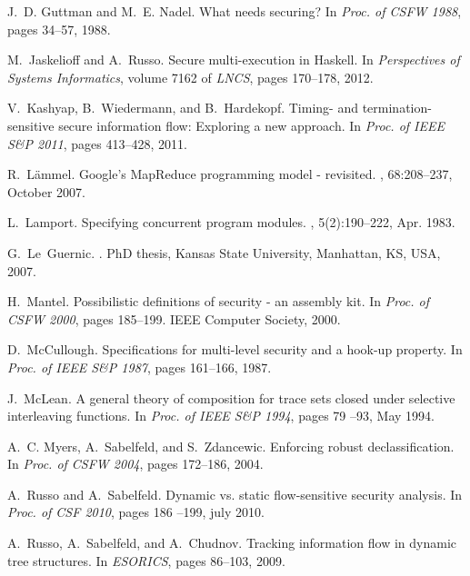 \documentclass[10pt,a4paper,oneside]{article}
\begin{document}
\begin{thebibliography}{10}
J.~D. Guttman and M.~E. Nadel.
\newblock What needs securing?
\newblock In {\em Proc. of CSFW 1988}, pages 34--57, 1988.

M.~Jaskelioff and A.~Russo.
\newblock Secure multi-execution in {H}askell.
\newblock In {\em Perspectives of Systems Informatics}, volume 7162 of {\em
  LNCS}, pages 170--178, 2012.

V.~Kashyap, B.~Wiedermann, and B.~Hardekopf.
\newblock Timing- and termination-sensitive secure information flow: Exploring
  a new approach.
\newblock In {\em Proc. of IEEE S\&P 2011}, pages 413--428, 2011.

R.~L\"{a}mmel.
\newblock Google's {MapReduce} programming model - revisited.
, 68:208--237, October 2007.

L.~Lamport.
\newblock Specifying concurrent program modules.
,
  5(2):190--222, Apr. 1983.

G.~Le~Guernic.
.
\newblock PhD thesis, Kansas State University, Manhattan, KS, USA, 2007.

H.~Mantel.
\newblock Possibilistic definitions of security - an assembly kit.
\newblock In {\em Proc. of CSFW 2000}, pages 185--199. IEEE Computer Society,
  2000.

D.~McCullough.
\newblock Specifications for multi-level security and a hook-up property.
\newblock In {\em Proc. of IEEE S\&P 1987}, pages 161--166, 1987.

J.~McLean.
\newblock A general theory of composition for trace sets closed under selective
  interleaving functions.
\newblock In {\em Proc. of IEEE S\&P 1994}, pages 79 --93, May 1994.

A.~C. Myers, A.~Sabelfeld, and S.~Zdancewic.
\newblock Enforcing robust declassification.
\newblock In {\em Proc. of CSFW 2004}, pages 172--186, 2004.

A.~Russo and A.~Sabelfeld.
\newblock Dynamic vs. static flow-sensitive security analysis.
\newblock In {\em Proc. of CSF 2010}, pages 186 --199, july 2010.

A.~Russo, A.~Sabelfeld, and A.~Chudnov.
\newblock Tracking information flow in dynamic tree structures.
\newblock In {\em ESORICS}, pages 86--103, 2009.


\end{thebibliography}
\end{document}
